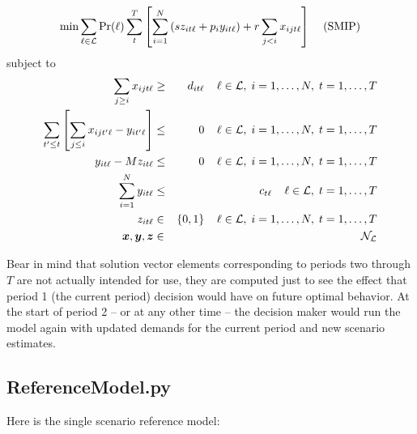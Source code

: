 \[
\min\sum_{\ell\in{\cal L}}\mbox{Pr}(\ell)
     \sum_{t}^{T}\left[\sum_{i=1}^{N}\left(sz_{it\ell}+p_{i}y_{it\ell}\right)
    +r\sum_{j<i}x_{ijt\ell}\right] \;\;\;\;\mbox{(SMIP)}
\]
subject to
\begin{eqnarray}
\sum_{j \geq i}x_{ijt\ell} & \geq & d_{it\ell} 
          \;\;\;\; \ell \in {\cal L}, \; i=1,\ldots,N, \; t=1,\ldots,T \label{Dconstr} \\
\sum_{t'\leq t}\left[\sum_{j \leq i}x_{ijt'\ell} - y_{it'\ell}\right] & \leq & 0 
          \;\;\;\; \ell \in {\cal L}, \; i=1,\ldots,N, \; t=1,\ldots,T \label{Pconstr} \\
y_{it\ell} - Mz_{it\ell} & \leq & 0 
          \;\;\;\; \ell \in {\cal L}, \;i=1,\ldots,N, \; t=1,\ldots,T \label{Mconstr} \\
\sum_{i=1}^{N}y_{it\ell} & \leq & c_{t\ell}
          \;\;\;\; \ell \in {\cal L}, \; t=1,\ldots,T \label{Cconstr} \\
z_{it\ell} & \in & \{0,1\} 
          \;\;\;\; \ell \in {\cal L}, \; i=1,\ldots,N, \; t=1,\ldots,T \label{intconstr} \\
\mbox{{\boldmath $x$}}, \mbox{{\boldmath $y$}}, \mbox{{\boldmath $z$}} & \in & {\cal N}_{\cal L} 
\end{eqnarray}

Bear in mind that solution vector elements corresponding
to periods two through $T$ are not actually intended for use, they 
are computed just to see the effect that period 1 (the current period) 
decision would have on future optimal behavior. At the start of period 2 
-- or at any other time -- the decision maker would run the model again 
with updated demands for the current period and new scenario estimates.

\subsection{ReferenceModel.py}

Here is the single scenario reference model:


